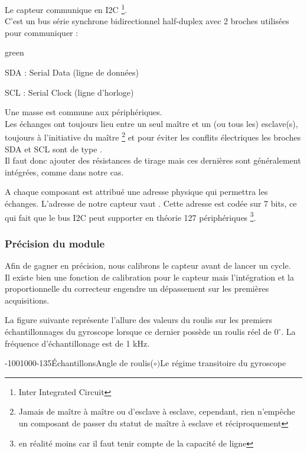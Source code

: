 { 
 
 Le capteur communique en I2C \footnote{Inter Integrated Circuit}.\\
C'est un bus série synchrone bidirectionnel half-duplex avec 2 broches utilisées pour communiquer :
\begin{items}{green}{\Triangle}
    \item SDA : Serial Data (ligne de données) 
    \item SCL : Serial Clock (ligne d'horloge) 
\end{items}

Une masse est commune aux périphériques.\\

Les échanges ont toujours lieu entre un seul maître et un (ou tous les) esclave(s), toujours à l’initiative du maître \footnote{Jamais de maître à maître ou d’esclave à esclave, cependant, rien n’empêche un composant de passer du statut de maître à esclave et réciproquement} et pour éviter les conflits électriques les broches SDA et SCL sont de type .\\ 
Il faut donc ajouter des résistances de tirage mais ces dernières sont généralement intégrées, comme dans notre cas.

A chaque composant est attribué une adresse physique qui permettra les échanges. L'adresse de notre capteur vaut . Cette adresse est codée sur 7 bits, ce qui fait que le bus I2C peut supporter en théorie 127 périphériques \footnote{en  réalité moins car il faut tenir compte de la capacité de ligne}.\\

\subsubsection{Précision du module}

Afin de gagner en précision, nous calibrons le capteur avant de lancer un cycle. \\Il existe bien une fonction de calibration pour le capteur mais l'intégration et la proportionnelle du correcteur engendre un dépassement sur les premières acquisitions. 

La figure suivante représente l'allure des valeurs du roulis sur les premiers échantillonnages du gyroscope lorsque ce dernier possède un roulis réel de $0^{\circ}$. La fréquence d'échantillonage est de 1 kHz.

\begin{graphicFigure}{0.6}{0.6}{-100}{1000}{-1}{35}{Échantillons}{Angle de roulis($\circ)$}{Le régime transitoire du gyroscope}
\end{graphicFigure}

}
